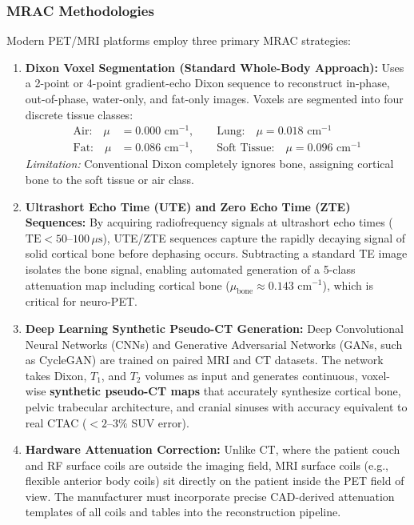 \documentclass[11pt,a4paper]{article}
\begin{document}
\subsubsection{MRAC Methodologies}
Modern PET/MRI platforms employ three primary MRAC strategies:
\begin{enumerate}
    \item \textbf{Dixon Voxel Segmentation (Standard Whole-Body Approach):} Uses a 2-point or 4-point gradient-echo Dixon sequence to reconstruct in-phase, out-of-phase, water-only, and fat-only images. Voxels are segmented into four discrete tissue classes:
    \begin{align}
        \text{Air:} \quad \mu &= 0.000\text{ cm}^{-1}, \qquad \text{Lung:} \quad \mu = 0.018\text{ cm}^{-1} \\
        \text{Fat:} \quad \mu &= 0.086\text{ cm}^{-1}, \qquad \text{Soft Tissue:} \quad \mu = 0.096\text{ cm}^{-1}
    \end{align}
    \textit{Limitation:} Conventional Dixon completely ignores bone, assigning cortical bone to the soft tissue or air class.
    \item \textbf{Ultrashort Echo Time (UTE) and Zero Echo Time (ZTE) Sequences:} By acquiring radiofrequency signals at ultrashort echo times ($\text{TE} < 50\text{--}100\,\mu\text{s}$), UTE/ZTE sequences capture the rapidly decaying signal of solid cortical bone before dephasing occurs. Subtracting a standard TE image isolates the bone signal, enabling automated generation of a 5-class attenuation map including cortical bone ($\mu_{\text{bone}} \approx 0.143\text{ cm}^{-1}$), which is critical for neuro-PET.
    \item \textbf{Deep Learning Synthetic Pseudo-CT Generation:} Deep Convolutional Neural Networks (CNNs) and Generative Adversarial Networks (GANs, such as CycleGAN) are trained on paired MRI and CT datasets. The network takes Dixon, $T_1$, and $T_2$ volumes as input and generates continuous, voxel-wise \textbf{synthetic pseudo-CT maps} that accurately synthesize cortical bone, pelvic trabecular architecture, and cranial sinuses with accuracy equivalent to real CTAC ($< 2\text{--}3\%$ SUV error).
    \item \textbf{Hardware Attenuation Correction:} Unlike CT, where the patient couch and RF surface coils are outside the imaging field, MRI surface coils (e.g., flexible anterior body coils) sit directly on the patient inside the PET field of view. The manufacturer must incorporate precise CAD-derived attenuation templates of all coils and tables into the reconstruction pipeline.
\end{enumerate}
\end{document}
